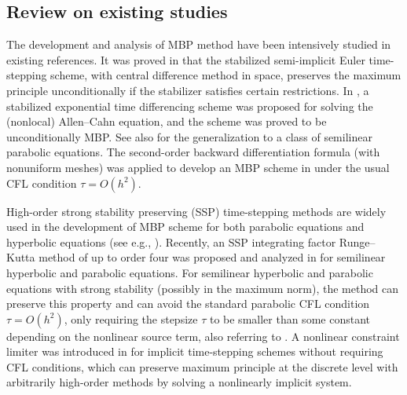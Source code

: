 \documentclass[10pt,final,leqno,onefignum,onetabnum]{siamltex}%
\begin{document}
\subsection{Review on existing studies}
The development and analysis of MBP method have been intensively studied in existing references.
It was proved in \cite{tangyang1,ShenTangYang:2016} that the stabilized semi-implicit Euler time-stepping scheme,
with central difference method in space, preserves the maximum principle unconditionally
if the stabilizer satisfies certain restrictions. In \cite{DuJuLiQiao:2019},
a stabilized exponential time differencing scheme was proposed for solving the (nonlocal) Allen--Cahn equation,
and the scheme was proved to be unconditionally MBP. See also \cite{DuJuLiQiao:2020}
for the generalization to a class of semilinear parabolic equations.
The second-order backward differentiation formula (with nonuniform meshes) was applied to develop an MBP scheme
in \cite{LiaoTangZhou:2020} under the usual CFL condition $\tau=O(h^2)$.

High-order strong stability preserving (SSP) time-stepping methods are widely used
in the development of MBP scheme for both parabolic equations and hyperbolic equations (see e.g.,  
\cite{gottlieb1998total,Liu-Yu-2014,GottliebShuTadmor:2001,gottlieb2011strong,Liu-Osher-1996,Qiu-Shu-2005,Xu-2014,Zhang-Shu-2010}).
Recently, an SSP integrating factor Runge--Kutta method of up to order four was proposed and
analyzed in \cite{IsherwoodGrantGottlieb:2018} for semilinear hyperbolic and parabolic equations.
For semilinear hyperbolic and parabolic equations with strong stability (possibly in the maximum norm), the method
can preserve this property and can avoid the standard parabolic CFL condition $\tau=O(h^2)$, only requiring
the stepsize $\tau$ to be smaller than some constant depending on the nonlinear source term, also referring to \cite{ju2020maximum}.
A nonlinear constraint limiter was introduced in \cite{Vegt-Xia-Xu-2019} for implicit time-stepping
schemes without requiring CFL conditions, which can preserve maximum principle at the
discrete level with arbitrarily high-order methods by solving a nonlinearly implicit system.
\end{document}
